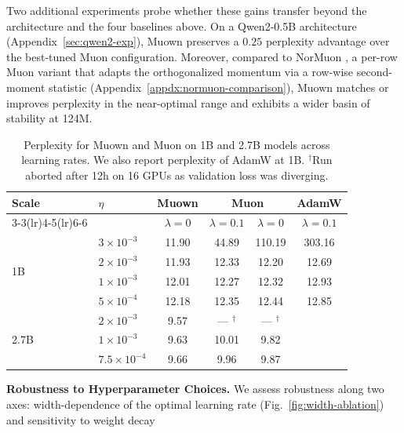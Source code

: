 \documentclass{article}
\newcommand{\algname}{Muown}
\begin{document}
Two additional experiments probe whether these gains transfer beyond the architecture and the four baselines above. On a Qwen2-0.5B \citep{yang_qwen2_2024} architecture (Appendix~\ref{sec:qwen2-exp}), \algname{} preserves a $0.25$ perplexity advantage over the best-tuned Muon configuration. Moreover, compared to NorMuon \citep{li_normuon_2025}, a per-row Muon variant that adapts the orthogonalized momentum via a row-wise second-moment statistic (Appendix~\ref{appdx:normuon-comparison}), \algname{} matches or improves perplexity in the near-optimal range and exhibits a wider basin of stability at 124M.

\begin{table}
    \centering
    \small
    \vspace{-10pt}
    \setlength{\tabcolsep}{6pt}
    \renewcommand{\arraystretch}{1.05}
    \caption{Perplexity for \algname{} and Muon on 1B and 2.7B models across learning rates. We also report perplexity of AdamW at 1B. $^{\dagger}$Run aborted after 12h on 16 GPUs as validation loss was diverging.}
    \label{tab:1B-results}
    \begin{tabular}{l l c cc c}
        \toprule
        Scale & $\eta$
         & \algname{} & \multicolumn{2}{c}{Muon} & AdamW \\
        \cmidrule(lr){3-3}\cmidrule(lr){4-5}\cmidrule(lr){6-6}
         &
         & $\lambda=0$ & $\lambda=0.1$ & $\lambda=0$ & $\lambda= 0.1$ \\
        \midrule
        \multirow{4}{*}{1B}
          & $3   \times 10^{-3}$ & 11.90 & 44.89 & 110.19 & 303.16 \\
          & $2   \times 10^{-3}$ & 11.93 & 12.33 &  12.20 &  12.69 \\
          & $1   \times 10^{-3}$ & 12.01 & 12.27 &  12.32 &  12.93 \\
          & $5   \times 10^{-4}$ & 12.18 & 12.35 &  12.44 &  12.85 \\
        \midrule
        \multirow{3}{*}{2.7B}
          & $2   \times 10^{-3}$ & 9.57  & --- $^\dagger$    &  --- $^\dagger$    & \phantom{--} \\
          & $1   \times 10^{-3}$ & 9.63  & 10.01 &  9.82  & \phantom{--} \\
          & $7.5 \times 10^{-4}$ & 9.66  & 9.96 &  9.87 & \phantom{--} \\
        \bottomrule
    \end{tabular}
\end{table}
\textbf{Robustness to Hyperparameter Choices.} We assess robustness along two axes: width-dependence of the optimal learning rate (Fig.~\ref{fig:width-ablation}) and sensitivity to weight decay
\end{document}
